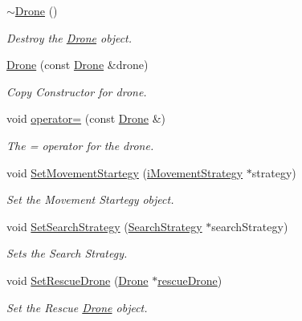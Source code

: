 \begin{DoxyCompactItemize}
\mbox{\label{classDrone_a667075abb1eb5c54be6418884a387d14}} 
\hyperlink{classDrone_a667075abb1eb5c54be6418884a387d14}{$\sim$\+Drone} ()
\begin{DoxyCompactList}\small\item\em Destroy the \hyperlink{classDrone}{Drone} object. \end{DoxyCompactList}\item 
\mbox{\label{classDrone_a77ede44227d2345f1930ee940923ce55}} 
\hyperlink{classDrone_a77ede44227d2345f1930ee940923ce55}{Drone} (const \hyperlink{classDrone}{Drone} \&drone)
\begin{DoxyCompactList}\small\item\em Copy Constructor for drone. \end{DoxyCompactList}\item 
\mbox{\label{classDrone_a60993a186f448dbc930c262d3d7d17f5}} 
void \hyperlink{classDrone_a60993a186f448dbc930c262d3d7d17f5}{operator=} (const \hyperlink{classDrone}{Drone} \&)
\begin{DoxyCompactList}\small\item\em The = operator for the drone. \end{DoxyCompactList}\item 
void \hyperlink{classDrone_a3987b919bf886857c139d2cde97d1d49}{Set\+Movement\+Startegy} (\hyperlink{classiMovementStrategy}{i\+Movement\+Strategy} $\ast$strategy)
\begin{DoxyCompactList}\small\item\em Set the Movement Startegy object. \end{DoxyCompactList}\item 
\mbox{\label{classDrone_acff4a233892a97186deab0cdca8b71d7}} 
void \hyperlink{classDrone_acff4a233892a97186deab0cdca8b71d7}{Set\+Search\+Strategy} (\hyperlink{classSearchStrategy}{Search\+Strategy} $\ast$search\+Strategy)
\begin{DoxyCompactList}\small\item\em Sets the Search Strategy. \end{DoxyCompactList}\item 
void \hyperlink{classDrone_ac9aa5a105012c7ba8be6542217e58242}{Set\+Rescue\+Drone} (\hyperlink{classDrone}{Drone} $\ast$\hyperlink{classDrone_ad5f726ad8f4c40ecf159ddb218346029}{rescue\+Drone})
\begin{DoxyCompactList}\small\item\em Set the Rescue \hyperlink{classDrone}{Drone} object. \end{DoxyCompactList}\end{DoxyCompactItemize}
